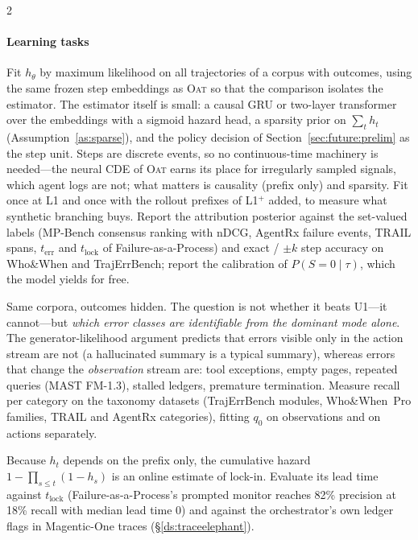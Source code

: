 \begin{multicols}{2}
\paragraph{Learning tasks}
\begin{description}[leftmargin=1.4em,style=nextline,itemsep=1pt]
\item[U1 --- Outcome-supervised hazard (L1 and L1$^{+}$).] Fit $h_\theta$ by maximum likelihood on all trajectories of a corpus with outcomes, using the same frozen step embeddings as \textsc{Oat} so that the comparison isolates the estimator. The estimator itself is small: a causal GRU or two-layer transformer over the embeddings with a sigmoid hazard head, a sparsity prior on $\sum_t h_t$ (Assumption~\ref{as:sparse}), and the policy decision of Section~\ref{sec:future:prelim} as the step unit. Steps are discrete events, so no continuous-time machinery is needed---the neural CDE of \textsc{Oat} earns its place for irregularly sampled signals, which agent logs are not; what matters is causality (prefix only) and sparsity. Fit once at L1 and once with the rollout prefixes of L1$^{+}$ added, to measure what synthetic branching buys. Report the attribution posterior against the set-valued labels (MP-Bench consensus ranking with nDCG, AgentRx failure events, TRAIL spans, $t_{\mathrm{err}}$ and $t_{\mathrm{lock}}$ of Failure-as-a-Process) and exact / $\pm k$ step accuracy on Who\&When and TrajErrBench; report the calibration of $P(S{=}0\mid\tau)$, which the model yields for free.
\item[U2 --- Fully unsupervised change-point model (L0).] Same corpora, outcomes hidden. The question is not whether it beats U1---it cannot---but \emph{which error classes are identifiable from the dominant mode alone}. The generator-likelihood argument predicts that errors visible only in the action stream are not (a hallucinated summary is a typical summary), whereas errors that change the \emph{observation} stream are: tool exceptions, empty pages, repeated queries (MAST FM-1.3), stalled ledgers, premature termination. Measure recall per category on the taxonomy datasets (TrajErrBench modules, Who\&When~Pro families, TRAIL and AgentRx categories), fitting $q_0$ on observations and on actions separately.
\item[U3 --- Prefix monitor.] Because $h_t$ depends on the prefix only, the cumulative hazard $1-\prod_{s\le t}(1-h_s)$ is an online estimate of lock-in. Evaluate its lead time against $t_{\mathrm{lock}}$ (Failure-as-a-Process's prompted monitor reaches 82\% precision at 18\% recall with median lead time 0) and against the orchestrator's own ledger flags in Magentic-One traces (\S\ref{ds:traceelephant}).
\end{description}


\end{multicols}
